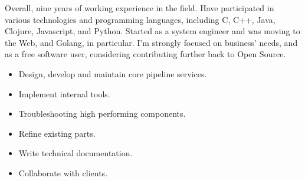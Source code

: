 \documentclass[10pt,a4paper,ragged2e,withhyper]{altacv}
\begin{document}


\makecvheader


Overall, nine years of working experience in the field. Have participated in
various technologies and programming languages, including C, C++, Java, Clojure,
Javascript, and Python. Started as a system engineer and was moving to the Web,
and Golang, in particular. I'm strongly focused on business' needs, and as a
free software user, considering contributing further back to Open Source.




    
 

\divider


          
\cvtag{\LaTeX{}}    

\begin{itemize}
\item Design, develop and maintain core pipeline services.
\item Implement internal tools.
\item Troubleshooting high performing components.
\item Refine existing parts.
\item Write technical documentation.
\item Collaborate with clients.
\end{itemize}
\end{document}

